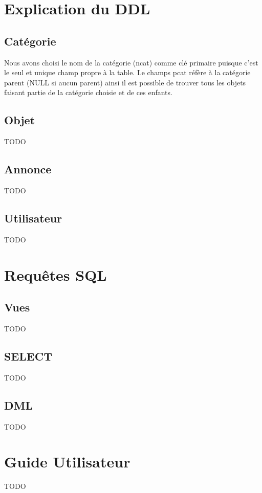 \documentclass[a4paper,12pt]{article}
\begin{document}
\begin{spacing}{1}
	\section*{Explication du DDL}
	\subsection*{Catégorie}
	Nous avons choisi le nom de la catégorie (ncat) comme clé primaire puisque c'est le seul et unique champ propre à la table. Le champs pcat réfère à la catégorie parent (NULL si aucun parent) ainsi il est possible de trouver tous les objets faisant partie de la catégorie choisie et de ces enfants.
	\subsection*{Objet}
	TODO
	\subsection*{Annonce}
	TODO
	\subsection*{Utilisateur}
	TODO
	\section*{Requêtes SQL}
	\subsection*{Vues}
	TODO
	\subsection*{SELECT}
	TODO
	\subsection*{DML}
	TODO
	\section*{Guide Utilisateur}
	TODO
	\end{spacing}                                                 
\end{document}
